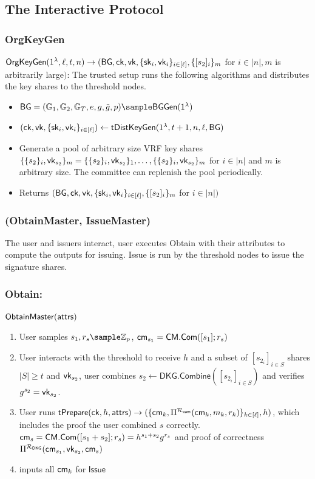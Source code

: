 \subsection{The Interactive Protocol}

\subsubsection*{OrgKeyGen}

$\mathsf{OrgKeyGen}(1^{\lambda}, \ell, t, n) \to (\mathsf{BG}, \mathsf{ck}, \mathsf{vk}, \{\mathsf{sk}_i, \mathsf{vk}_i\}_{i \in [\ell]}, \{[s_2]_i\}_m$ for $i \in |n|, m$ is arbitrarily large$ ) $: The trusted setup runs the following algorithms and distributes the key shares to the threshold nodes.
    \begin{itemize}
        \item $\BG = (\G_1, \G_2, \G_T, e, g, \tilg, p) \sample \BGGen(\secparam)$
        \item $(\mathsf{ck}, \mathsf{vk}, \{\mathsf{sk}_i, \mathsf{vk}_i\}_{i \in [\ell]}) \gets \mathsf{tDistKeyGen}(1^{\lambda}, t+1, n, \ell, \mathsf{BG})$
        \item Generate a pool of arbitrary size VRF key shares $\{\{s_2\}_i, \mathsf{vk}_{s_2}\}_m = \{\{s_2\}_i, \mathsf{vk}_{s_2}\}_1, \ldots, \{\{s_2\}_i, \mathsf{vk}_{s_2}\}_m$ for $i \in |n|$ and $m$ is arbitrary size. The committee can replenish the pool periodically.
        \item Returns $(\mathsf{BG}, \mathsf{ck}, \mathsf{vk}, \{\mathsf{sk}_i, \mathsf{vk}_i\}_{i \in [\ell]}, \{[s_2]_i\}_m$ for $i \in |n| )$
    \end{itemize}

\subsubsection*{(ObtainMaster, IssueMaster)}
The user and issuers interact, user executes Obtain with their attributes to compute the outputs for issuing. Issue is run by the threshold nodes to issue the signature shares.
\subsubsection*{Obtain:}
$\mathsf{ObtainMaster}(\mathsf{attrs})$
\begin{enumerate}
    \item User samples $s_1, r_s \sample \Z_p$, $\mathsf{cm}_{s_1} = \mathsf{CM.Com}([s_1];r_s)$
    \item User interacts with the threshold to receive $h$ and a subset of $[s_{2_i}]_{i \in S}$ shares $|S| \geq t$ and $\mathsf{vk}_{s_2}$, user combines $s_2 \gets \mathsf{DKG.Combine}([s_{2_i}]_{i \in S})$ and verifies $g^{s_2} = \mathsf{vk}_{s_2}$. 
    \item User runs $\mathsf{tPrepare}(\mathsf{ck}, h, \mathsf{attrs}) \to (\{\mathsf{cm}_k, \Pi^{\mathcal{R}_{\mathsf{com}}}(\mathsf{cm}_k, m_k, r_k)\}_{k \in [\ell]}, h)$, which includes the proof the user combined $s$ correctly. $\mathsf{cm}_s = \mathsf{CM.Com}([s_1 + s_2];r_s) = h^{s_1 + s_2}g^{r_s}$ and proof of correctness $\Pi^{\mathcal{R}_{\mathsf{DKG}}}(\mathsf{cm}_{s_1},  \mathsf{vk}_{s_2}, \mathsf{cm}_s)$
    \item inputs all $\mathsf{cm}_k$ for $\mathsf{Issue}$
\end{enumerate}

